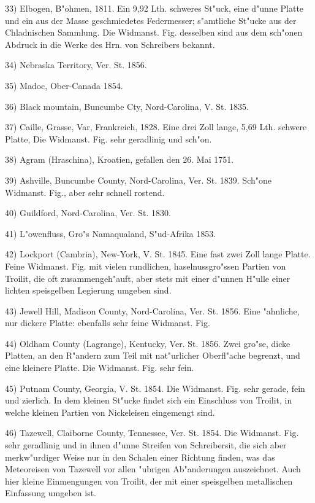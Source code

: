 \documentclass[a4paper, 11pt, oneside, german]{article}
\begin{document}
33) Elbogen, B"ohmen, 1811. Ein 9,92 Lth. schweres St"uck, eine d"unne Platte und ein aus der Masse geschmiedetes Federmesser; s"amtliche St"ucke aus der Chladnischen Sammlung. Die Widmanst. Fig. desselben sind aus dem sch"onen Abdruck in die Werke des Hrn. von Schreibers bekannt.

34) Nebraska Territory, Ver. St. 1856.

35) Madoc, Ober-Canada 1854.

36) Black mountain, Buncumbe Cty, Nord-Carolina, V. St. 1835.

37) Caille, Grasse, Var, Frankreich, 1828. Eine drei Zoll lange, 5,69 Lth. schwere Platte, Die Widmanst. Fig. sehr geradlinig und sch"on.

38) Agram (Hraschina), Kroatien, gefallen den 26. Mai 1751.

39) Ashville, Buncumbe County, Nord-Carolina, Ver. St. 1839. Sch"one Widmanst. Fig., aber sehr schnell rostend.

40) Guildford, Nord-Carolina, Ver. St. 1830.

41) L"owenfluss, Gro"s Namaqualand, S"ud-Afrika 1853.

42) Lockport (Cambria), New-York, V. St. 1845. Eine fast zwei Zoll lange Platte. Feine Widmanst. Fig. mit vielen rundlichen, haselnussgro"ssen Partien von Troilit, die oft zusammengeh"auft, aber stets mit einer d"unnen H"ulle einer lichten speisgelben Legierung umgeben sind.

43) Jewell Hill, Madison County, Nord-Carolina, Ver. St. 1856. Eine "ahnliche, nur dickere Platte: ebenfalls sehr feine Widmanst. Fig.

44) Oldham County (Lagrange), Kentucky, Ver. St. 1856. Zwei gro"se, dicke Platten, an den R"andern zum Teil mit nat"urlicher Oberfl"ache begrenzt, und eine kleinere Platte. Die Widmanst. Fig. sehr fein.

45) Putnam County, Georgia, V. St. 1854. Die Widmanst. Fig. sehr gerade, fein und zierlich. In dem kleinen St"ucke findet sich ein Einschluss von Troilit, in welche kleinen Partien von Nickeleisen eingemengt sind.

46) Tazewell, Claiborne County, Tennessee, Ver. St. 1854. Die Widmanst. Fig. sehr geradlinig und in ihnen d"unne Streifen von Schreibersit, die sich aber merkw"urdiger Weise nur in den Schalen einer Richtung finden, was das Meteoreisen von Tazewell vor allen "ubrigen Ab"anderungen auszeichnet. Auch hier kleine Einmengungen von Troilit, der mit einer speisgelben metallischen Einfassung umgeben ist.
\vspace{\medskipamount}
\end{document}
